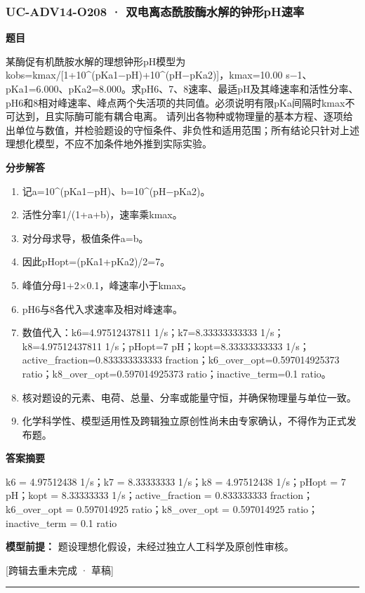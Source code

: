 \documentclass[UTF8,11pt,a4paper]{ctexart}
\begin{document}
\subsubsection*{UC-ADV14-O208 · 双电离态酰胺酶水解的钟形pH速率}
\noindent\textbf{题目}\par
某酶促有机酰胺水解的理想钟形pH模型为kobs=kmax/[1+10\textasciicircum{}(pKa1−pH)+10\textasciicircum{}(pH−pKa2)]，kmax=10.00 s−1、pKa1=6.000、pKa2=8.000。求pH6、7、8速率、最适pH及其峰速率和活性分率、pH6和8相对峰速率、峰点两个失活项的共同值。必须说明有限pKa间隔时kmax不可达到，且实际酶可能有耦合电离。 请列出各物种或物理量的基本方程、逐项给出单位与数值，并检验题设的守恒条件、非负性和适用范围；所有结论只针对上述理想化模型，不应不加条件地外推到实际实验。\par
\medskip\noindent\textbf{分步解答}
\begin{enumerate}
\item 记a=10\textasciicircum{}(pKa1−pH)、b=10\textasciicircum{}(pH−pKa2)。
\item 活性分率1/(1+a+b)，速率乘kmax。
\item 对分母求导，极值条件a=b。
\item 因此pHopt=(pKa1+pKa2)/2=7。
\item 峰值分母1+2×0.1，峰速率小于kmax。
\item pH6与8各代入求速率及相对峰速率。
\item 数值代入：k6=4.97512437811 1/s；k7=8.33333333333 1/s；k8=4.97512437811 1/s；pHopt=7 pH；kopt=8.33333333333 1/s；active\_fraction=0.833333333333 fraction；k6\_over\_opt=0.597014925373 ratio；k8\_over\_opt=0.597014925373 ratio；inactive\_term=0.1 ratio。
\item 核对题设的元素、电荷、总量、分率或能量守恒，并确保物理量与单位一致。
\item 化学科学性、模型适用性及跨辑独立原创性尚未由专家确认，不得作为正式发布题。
\end{enumerate}
\noindent\textbf{答案摘要}\par
k6 = 4.97512438 1/s；k7 = 8.33333333 1/s；k8 = 4.97512438 1/s；pHopt = 7 pH；kopt = 8.33333333 1/s；active\_fraction = 0.833333333 fraction；k6\_over\_opt = 0.597014925 ratio；k8\_over\_opt = 0.597014925 ratio；inactive\_term = 0.1 ratio\par
\noindent\textbf{模型前提：}
题设理想化假设，未经过独立人工科学及原创性审核。\par
\noindent\textcolor{red!65!black}{[跨辑去重未完成 · 草稿]} \par
\medskip\hrule\medskip
{}
\end{document}
